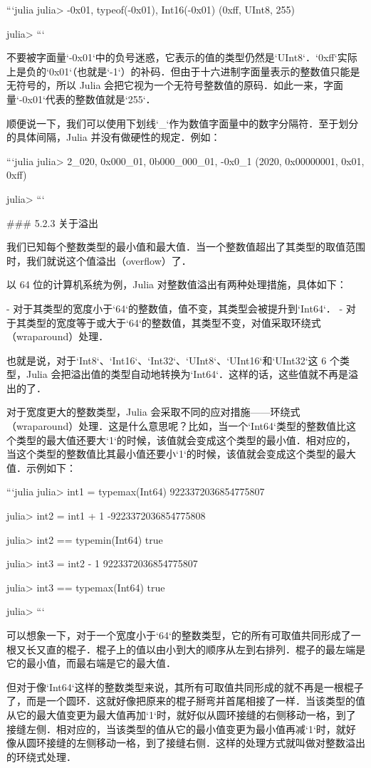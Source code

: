 ```julia
julia> -0x01, typeof(-0x01), Int16(-0x01)
(0xff, UInt8, 255)

julia> 
```

不要被字面量`-0x01`中的负号迷惑，它表示的值的类型仍然是`UInt8`．`0xff`实际上是负的`0x01`（也就是`-1`）的补码．但由于十六进制字面量表示的整数值只能是无符号的，所以 Julia 会把它视为一个无符号整数值的原码．如此一来，字面量`-0x01`代表的整数值就是`255`．

顺便说一下，我们可以使用下划线`_`作为数值字面量中的数字分隔符．至于划分的具体间隔，Julia 并没有做硬性的规定．例如：

```julia
julia> 2_020, 0x000_01, 0b000_000_01, -0x0_1
(2020, 0x00000001, 0x01, 0xff)

julia> 
```

### 5.2.3 关于溢出

我们已知每个整数类型的最小值和最大值．当一个整数值超出了其类型的取值范围时，我们就说这个值溢出（overflow）了．

以 64 位的计算机系统为例，Julia 对整数值溢出有两种处理措施，具体如下：

- 对于其类型的宽度小于`64`的整数值，值不变，其类型会被提升到`Int64`．
- 对于其类型的宽度等于或大于`64`的整数值，其类型不变，对值采取环绕式（wraparound）处理．

也就是说，对于`Int8`、`Int16`、`Int32`‌、`UInt8`、`UInt16`和`UInt32`这 6 个类型，Julia 会把溢出值的类型自动地转换为`Int64`．这样的话，这些值就不再是溢出的了．

对于宽度更大的整数类型，Julia 会采取不同的应对措施——环绕式（wraparound）处理．这是什么意思呢？比如，当一个`Int64`类型的整数值比这个类型的最大值还要大`1`的时候，该值就会变成这个类型的最小值．相对应的，当这个类型的整数值比其最小值还要小`1`的时候，该值就会变成这个类型的最大值．示例如下：

```julia
julia> int1 = typemax(Int64)
9223372036854775807

julia> int2 = int1 + 1
-9223372036854775808

julia> int2 == typemin(Int64)
true

julia> int3 = int2 - 1
9223372036854775807

julia> int3 == typemax(Int64)
true

julia> 
```

可以想象一下，对于一个宽度小于`64`的整数类型，它的所有可取值共同形成了一根又长又直的棍子．棍子上的值以由小到大的顺序从左到右排列．棍子的最左端是它的最小值，而最右端是它的最大值．

但对于像`Int64`这样的整数类型来说，其所有可取值共同形成的就不再是一根棍子了，而是一个圆环．这就好像把原来的棍子掰弯并首尾相接了一样．当该类型的值从它的最大值变更为最大值再加`1`时，就好似从圆环接缝的右侧移动一格，到了接缝左侧．相对应的，当该类型的值从它的最小值变更为最小值再减`1`时，就好像从圆环接缝的左侧移动一格，到了接缝右侧．这样的处理方式就叫做对整数溢出的环绕式处理．

